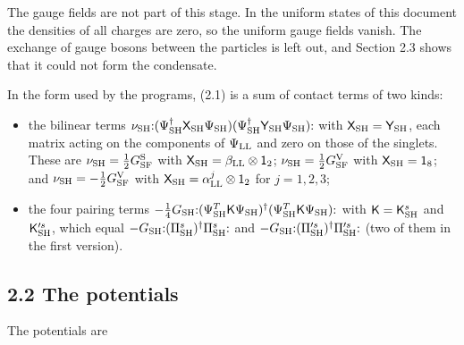 \documentclass[
  10pt,
]{article}
\providecommand{\tightlist}{%
  \setlength{\itemsep}{0pt}\setlength{\parskip}{0pt}}
\begin{document}
The gauge fields are not part of this stage. In the uniform states of
this document the densities of all charges are zero, so the uniform
gauge fields vanish. The exchange of gauge bosons between the particles
is left out, and Section 2.3 shows that it could not form the
condensate.

In the form used by the programs, (2.1) is a sum of contact terms of two
kinds:

\begin{itemize}
\tightlist
\item
  the bilinear terms
  \(\nu_{\rm SH}{:}(\Psi^\dagger_{\rm SH}\mathsf X_{\rm SH}\Psi_{\rm SH})(\Psi^\dagger_{\rm SH}\mathsf Y_{\rm SH}\Psi_{\rm SH}){:}\)
  with \(\mathsf X_{\rm SH}=\mathsf Y_{\rm SH}\), each matrix acting on
  the components of \(\Psi_{\rm LL}\) and zero on those of the singlets.
  These are \(\nu_{\rm SH}=\tfrac12G^{\rm S}_{\rm SF}\) with
  \(\mathsf X_{\rm SH}=\beta_{\rm LL}\otimes\mathsf 1_2\);
  \(\nu_{\rm SH}=\tfrac12G^{\rm V}_{\rm SF}\) with
  \(\mathsf X_{\rm SH}=\mathsf 1_8\); and
  \(\nu_{\rm SH}=-\tfrac12G^{\rm V}_{\rm SF}\) with
  \(\mathsf X_{\rm SH}=\alpha^j_{\rm LL}\otimes\mathsf 1_2\) for
  \(j=1,2,3\);
\item
  the four pairing terms
  \(-\tfrac14G_{\rm SH}{:}(\Psi^T_{\rm SH}\mathsf K\Psi_{\rm SH})^\dagger(\Psi^T_{\rm SH}\mathsf K\Psi_{\rm SH}){:}\)
  with \(\mathsf K=\mathsf K^s_{\rm SH}\) and \(\mathsf K'^s_{\rm SH}\),
  which equal
  \(-G_{\rm SH}{:}(\Pi^s_{\rm SH})^\dagger\Pi^s_{\rm SH}{:}\) and
  \(-G_{\rm SH}{:}(\Pi'^s_{\rm SH})^\dagger\Pi'^s_{\rm SH}{:}\) (two of
  them in the first version).
\end{itemize}

\hypertarget{the-potentials}{%
\subsection{2.2 The potentials}\label{the-potentials}}

The potentials are
\end{document}
